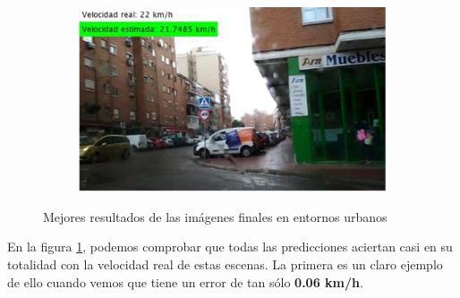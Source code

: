 \begin{figure}[H]
\begin{subfigure}[b]{0.45\linewidth}
  \end{subfigure}
  \begin{subfigure}[b]{0.45\linewidth}
    \includegraphics[width=\linewidth]{Figuras/Resultado_SVR_Urbano_BIEN_4.eps}
  \end{subfigure}
  \caption{Mejores resultados de las imágenes finales en entornos urbanos}
  \label{fig:SVR_Urbano_BIEN}
\end{figure}

En la figura \ref{fig:SVR_Urbano_BIEN}, podemos comprobar que todas las predicciones aciertan casi en su totalidad con la velocidad real de estas escenas. La primera es un claro ejemplo de ello cuando vemos que tiene un error de tan sólo \textbf{0.06 km/h}.





